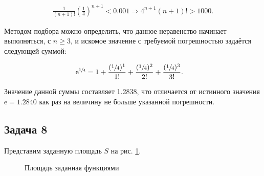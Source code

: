 \documentclass[a4paper,11pt]{article}
\newcommand{\e}{\mathrm{e}}
\begin{document}
\begin{align*}
\frac{1}{(n+1)!}(\frac{1}{4})^{n+1} < 0.001 \Rightarrow 4^{n+1}(n+1)! > 1000.
\end{align*}

Методом подбора можно определить, что данное неравенство начинает выполняться, с $n \geq 3$, и искомое значение с требуемой погрешностью задаётся следующей суммой:

\begin{align*}
\e^{\sfrac{1}{4}} & = 1 +\frac{(\sfrac{1}{4})^1}{1!} + \frac{(\sfrac{1}{4})^2}{2!} + \frac{(\sfrac{1}{4})^3}{3!}.
\end{align*}

Значение данной суммы составляет 1.2838, что отличается от истинного значения $\e = 1.2840$ как раз на величину не больше указанной погрешности.

\subsection{Задача 8}

Представим заданную площадь $S$ на рис. \ref{fig:task8}. 

\begin{figure}[h!]
  \begin{center}
  \end{center}
  \caption{Площадь заданная функциями}
  \label{fig:task8}
\end{figure}
\end{document}
